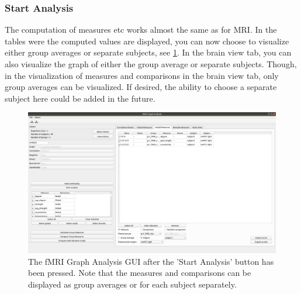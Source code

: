 \documentclass{article}
\begin{document}
\subsubsection{Start Analysis}

The computation of measures etc works almost the same as for MRI. In  the tables were the computed values are displayed, you can now choose to visualize either group averages or separate subjects, see \cref{fig:fmri_sa}. In the brain view tab, you can also visualize the graph of either the group average or separate subjects. Though, in the visualization of measures and comparisons in the brain view tab, only group averages can be visualized. If desired, the ability to choose a separate subject here could be added in the future.

\begin{figure}[H]
    \centering
    \includegraphics[width=\linewidth]{fmri_sa.png}
    \caption{The fMRI Graph Analysis GUI after the 'Start Analysis' button has been pressed. Note that the measures and comparisons can be displayed as group averages or for each subject separately.}
    \label{fig:fmri_sa}
\end{figure}
\end{document}
